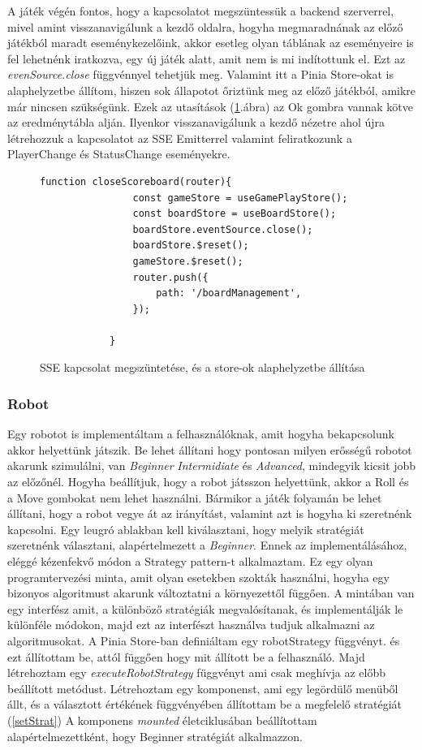 \documentclass[a4paper,twoside]{article}
\begin{document}
A játék végén fontos, hogy a kapcsolatot megszüntessük a backend szerverrel, mivel amint visszanavigálunk a kezdő oldalra, hogyha megmaradnának az előző játékból maradt eseménykezelőink, akkor esetleg olyan táblának az eseményeire is fel lehetnénk iratkozva, egy új játék alatt, amit nem is mi indítottunk el. Ezt az \textit{evenSource.close} függvénnyel tehetjük meg. Valamint itt a Pinia Store-okat is alaphelyzetbe állítom, hiszen sok állapotot őriztünk meg az előző játékból, amikre már nincsen szükségünk. Ezek az utasítások (\ref{reset}.ábra) az Ok gombra vannak kötve az eredménytábla alján. Ilyenkor visszanavigálunk a kezdő nézetre ahol újra létrehozzuk a kapcsolatot az SSE Emitterrel valamint feliratkozunk a PlayerChange és StatusChange eseményekre.  
\begin{figure}
	\caption{SSE kapcsolat megszüntetése, és a store-ok alaphelyzetbe állítása}
	\begin{minipage}{\textwidth}
		\begin{lstlisting}[style=javascriptStyle]
			function closeScoreboard(router){
				const gameStore = useGamePlayStore();
				const boardStore = useBoardStore();
				boardStore.eventSource.close();
				boardStore.$reset();
				gameStore.$reset();
				router.push({
					path: '/boardManagement',
				});
				
			}
		\end{lstlisting}
	\end{minipage}
	
	\label{reset}
\end{figure}
\FloatBarrier
\subsubsection{Robot}
Egy robotot is implementáltam a felhasználóknak, amit hogyha bekapcsolunk akkor helyettünk játszik. Be lehet állítani hogy pontosan milyen erősségű robotot akarunk szimulálni, van \textit{Beginner} \textit{Intermidiate} és \textit{Advanced}, mindegyik kicsit jobb az előzőnél. Hogyha beállítjuk, hogy a robot játsszon helyettünk, akkor a Roll és a Move gombokat nem lehet használni. Bármikor a játék folyamán be lehet állítani, hogy a robot vegye át az irányítást, valamint azt is hogyha ki szeretnénk kapcsolni. Egy leugró ablakban kell kiválasztani, hogy melyik stratégiát szeretnénk választani, alapértelmezett a \textit{Beginner}. Ennek az implementálásához, eléggé kézenfekvő módon a Strategy pattern-t alkalmaztam. Ez egy olyan programtervezési minta, amit olyan esetekben szokták használni, hogyha egy bizonyos algoritmust akarunk változtatni a környezettől függően. A mintában van egy interfész amit, a különböző stratégiák megvalósítanak, és implementálják le különféle módokon, majd ezt az interfészt használva tudjuk alkalmazni az algoritmusokat. A Pinia Store-ban definiáltam egy robotStrategy függvényt. és ezt állítottam be, attól függően hogy mit állított be a felhasználó. Majd létrehoztam egy \textit{executeRobotStrategy} függvényt ami csak meghívja az előbb beállított metódust. Létrehoztam egy komponenst, ami egy legördülő menüből állt, és a választott értékének függvényében állítottam be a megfelelő stratégiát (\ref{setStrat}) A komponens \textit{mounted} életciklusában beállítottam alapértelmezettként, hogy Beginner stratégiát alkalmazzon.
\end{document}
